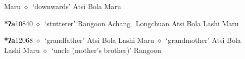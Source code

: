 \begin{list}{}{\leftmargin=1.5em \itemindent=-1.5em}
\hspace{1ex}
         Maru 
\hspace{1ex}
         $\diamond$~`downwards'
         Atsi 
\hspace{1ex}
         Bola 
\hspace{1ex}
         Maru 
  \item {\footnotesize \textbf{*ʔa}}{\tiny 10840}
\hspace{1ex}
         $\diamond$~`stutterer'
         Rangoon 
\hspace{1ex}
         Achang\_Longchuan 
\hspace{1ex}
         Atsi 
\hspace{1ex}
         Bola 
\hspace{1ex}
         Lashi 
\hspace{1ex}
         Maru 
  \item {\footnotesize \textbf{*ʔa}}{\tiny 12068}
\hspace{1ex}
         $\diamond$~`grandfather'
         Atsi 
\hspace{1ex}
         Bola 
\hspace{1ex}
         Lashi 
\hspace{1ex}
         Maru 
\hspace{1ex}
         $\diamond$~`grandmother'
         Atsi 
\hspace{1ex}
         Bola 
\hspace{1ex}
         Lashi 
\hspace{1ex}
         Maru 
\hspace{1ex}
         $\diamond$~`uncle (mother's brother)'
         Rangoon 
\hspace{1ex}

\end{list}
